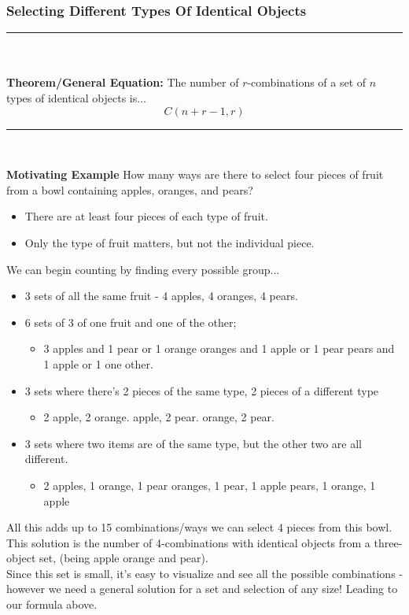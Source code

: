 \documentclass[12pt, letterpaper]{article}
\newcommand{\horizline}[0]{\noindent\rule{\textwidth}{1pt}\\}
\begin{document}
\subsubsection{Selecting Different Types Of Identical Objects}

\horizline \vspace*{-0.5cm} \\
\textbf{Theorem/General Equation:} The number of $r$-combinations of a set of $n$ types of identical objects is... \[  C(n+r - 1, r) \]
\vspace*{-0.5cm} \horizline \vspace*{-0.05cm}

\textbf{Motivating Example}
How many ways are there to select four pieces of fruit from a bowl containing apples, oranges, and pears?
\begin{itemize}[leftmargin=*,  label={}]
	\item There are at least four pieces of each type of fruit.
	\item Only the type of fruit matters, but not the individual piece.
\end{itemize}

We can begin counting by finding every possible group... 
{\tiny 
\begin{itemize}[leftmargin=*,  label={}]
	\item 3 sets of all the same fruit - 4 apples, 4 oranges, 4 pears. 
	\item 6 sets of 3 of one fruit and one of the other;
	\begin{itemize}
		\item 3 apples and 1 pear or 1 orange \quad {} oranges and 1 apple or 1 pear \quad {} pears and 1 apple or 1 one other.
	\end{itemize}
	\item 3 sets where there's 2 pieces of the same type, 2 pieces of a different type
	\begin{itemize}
		\item 2 apple, 2 orange. \quad {} apple, 2 pear. \quad {} orange, 2 pear.  
	\end{itemize}
	\item 3 sets where two items are of the same type, but the other two are all different. 
	\begin{itemize}
		\item 2 apples, 1 orange, 1 pear \quad {} oranges, 1 pear, 1 apple  \quad {} pears, 1 orange, 1 apple
	\end{itemize}
\end{itemize}
}
All this adds up to 15 combinations/ways we can select 4 pieces from this bowl. \\ 
This solution is the number of 4-combinations with identical objects from a three-object set, (being apple orange and pear). \\ 
Since this set is small, it's easy to visualize and see all the possible combinations - however we need a general solution for a set and selection of any size! Leading to our formula above.
\end{document}
